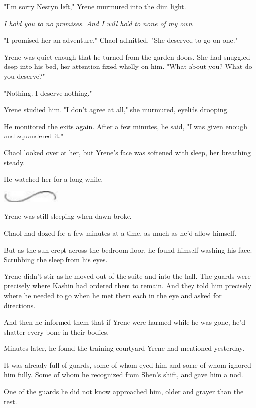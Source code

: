 "I'm sorry Nesryn left," Yrene murmured into the dim light.

\emph{I hold you to no promises.
And I will hold to none of my own.}

"I promised her an adventure," Chaol admitted.
"She deserved to go on one."

Yrene was quiet enough that he turned from the garden doors.
She had snuggled deep into his bed, her attention fixed wholly on him.
"What about you?
What do you deserve?"

"Nothing.
I deserve nothing."

Yrene studied him.
"I don't agree at all," she murmured, eyelids drooping.

He monitored the exits again.
After a few minutes, he said, "I was given enough and squandered it."

Chaol looked over at her, but Yrene's face was softened with sleep, her breathing steady.

He watched her for a long while.

\begin{center}
	\includegraphics[width=1.12in,height=0.24in]{images/seperator}
\end{center}

Yrene was still sleeping when dawn broke.

Chaol had dozed for a few minutes at a time, as much as he'd allow himself.

But as the sun crept across the bedroom floor, he found himself washing his face.
Scrubbing the sleep from his eyes.

Yrene didn't stir as he moved out of the suite and into the hall.
The guards were precisely where Kashin had ordered them to remain.
And they told him precisely where he needed to go when he met them each in the eye and asked for directions.

And then he informed them that if Yrene were harmed while he was gone, he'd shatter every bone in their bodies.

Minutes later, he found the training courtyard Yrene had mentioned yesterday.

It was already full of guards, some of whom eyed him and some of whom ignored him fully.
Some of whom he recognized from Shen's shift, and gave him a nod.

One of the guards he did not know approached him, older and grayer than the rest.

